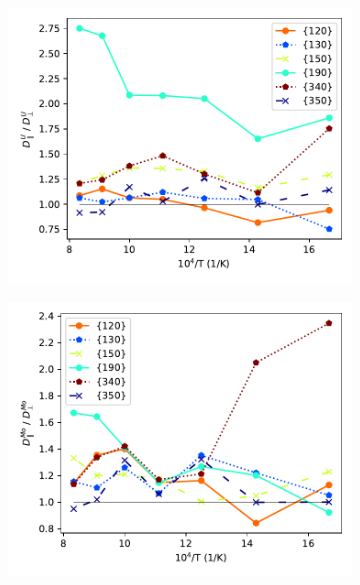 \documentclass{elsarticle}
\providecommand{\DIFaddend}{} %
\providecommand{\DIFaddbeginFL}{} %
\providecommand{\DIFaddendFL}{} %
\providecommand{\DIFdelbeginFL}{} %
\providecommand{\DIFdelendFL}{} %
\begin{document}
\DIFaddend \begin{figure}[!ht]
    \centering
    \begin{subfigure}{0.49\textwidth}
        \centering
        \caption{}
        \DIFdelbeginFL %
\DIFdelendFL \DIFaddbeginFL \includegraphics[width=\textwidth]{ratio_U.pdf}
    \DIFaddendFL \end{subfigure}
    \begin{subfigure}{0.49\textwidth}
        \centering
        \caption{}
        \DIFdelbeginFL %
\DIFdelendFL \DIFaddbeginFL \includegraphics[width=\textwidth]{ratio_Mo.pdf}

\end{subfigure}
\end{figure}
\end{document}
